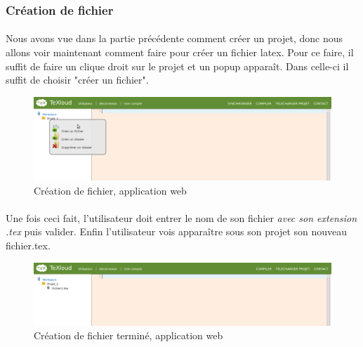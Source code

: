 \documentclass[a4paper,12pt]{article}
\begin{document}
\subsubsection{Création de fichier}
\paragraph*{}
Nous avons vue dans la partie précédente comment créer un projet, donc nous allons voir maintenant comment faire pour créer un fichier latex. Pour ce faire, il suffit de faire un clique droit sur le projet et un popup apparaît. Dans celle-ci il suffit de choisir "créer un fichier". 
\begin{figure}[!ht]
\begin{center}
  \includegraphics[width=1\textwidth]{./images/screenshot/MenuTextuel.png}
\end{center}
  \caption{Création de fichier, application web}
  \label{creationFichier}
\end{figure}

\clearpage

\paragraph*{}
Une fois ceci fait, l'utilisateur doit entrer le nom de son fichier \emph{avec son extension .tex} puis valider. Enfin l'utilisateur vois apparaître sous son projet son nouveau fichier.tex.
\begin{figure}[!ht]
\begin{center}
  \includegraphics[width=1\textwidth]{./images/screenshot/Suite_Creation_Fichier.png}
\end{center}
  \caption{Création de fichier terminé, application web}
  \label{creationFichierFin}
\end{figure}
\end{document}
